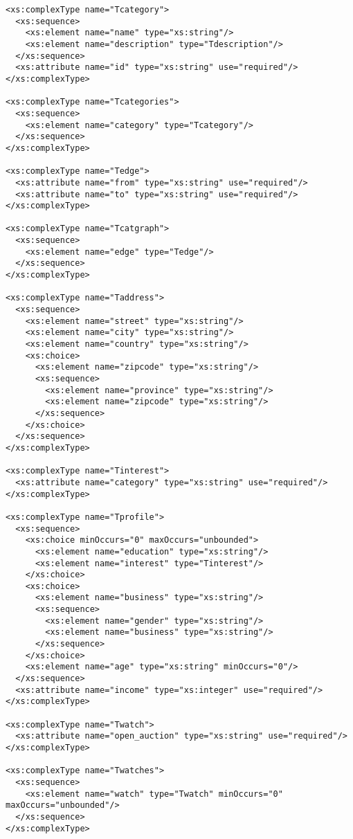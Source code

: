 \begin{lstlisting}[caption=Resulting XSD of Test Scenario B, frame=single, label=listing_xsd]
<xs:complexType name="Tcategory">
  <xs:sequence>
    <xs:element name="name" type="xs:string"/>
    <xs:element name="description" type="Tdescription"/>
  </xs:sequence>
  <xs:attribute name="id" type="xs:string" use="required"/>
</xs:complexType>

<xs:complexType name="Tcategories">
  <xs:sequence>
    <xs:element name="category" type="Tcategory"/>
  </xs:sequence>
</xs:complexType>

<xs:complexType name="Tedge">
  <xs:attribute name="from" type="xs:string" use="required"/>
  <xs:attribute name="to" type="xs:string" use="required"/>
</xs:complexType>

<xs:complexType name="Tcatgraph">
  <xs:sequence>
    <xs:element name="edge" type="Tedge"/>
  </xs:sequence>
</xs:complexType>

<xs:complexType name="Taddress">
  <xs:sequence>
    <xs:element name="street" type="xs:string"/>
    <xs:element name="city" type="xs:string"/>
    <xs:element name="country" type="xs:string"/>
    <xs:choice>
      <xs:element name="zipcode" type="xs:string"/>
      <xs:sequence>
        <xs:element name="province" type="xs:string"/>
        <xs:element name="zipcode" type="xs:string"/>
      </xs:sequence>
    </xs:choice>
  </xs:sequence>
</xs:complexType>

<xs:complexType name="Tinterest">
  <xs:attribute name="category" type="xs:string" use="required"/>
</xs:complexType>

<xs:complexType name="Tprofile">
  <xs:sequence>
    <xs:choice minOccurs="0" maxOccurs="unbounded">
      <xs:element name="education" type="xs:string"/>
      <xs:element name="interest" type="Tinterest"/>
    </xs:choice>
    <xs:choice>
      <xs:element name="business" type="xs:string"/>
      <xs:sequence>
        <xs:element name="gender" type="xs:string"/>
        <xs:element name="business" type="xs:string"/>
      </xs:sequence>
    </xs:choice>
    <xs:element name="age" type="xs:string" minOccurs="0"/>
  </xs:sequence>
  <xs:attribute name="income" type="xs:integer" use="required"/>
</xs:complexType>

<xs:complexType name="Twatch">
  <xs:attribute name="open_auction" type="xs:string" use="required"/>
</xs:complexType>

<xs:complexType name="Twatches">
  <xs:sequence>
    <xs:element name="watch" type="Twatch" minOccurs="0" maxOccurs="unbounded"/>
  </xs:sequence>
</xs:complexType>


\end{lstlisting}
